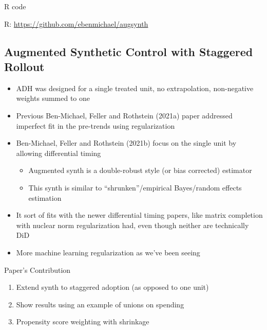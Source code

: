 \documentclass{beamer}
\begin{document}
\begin{frame}{R code}

R: \url{https://github.com/ebenmichael/augsynth}

\end{frame}

\subsection{Augmented Synthetic Control with Staggered Rollout}

\begin{frame}

\begin{itemize}
\item ADH was designed for a single treated unit, no extrapolation, non-negative weights summed to one
\item Previous Ben-Michael, Feller and Rothstein (2021a) paper addressed imperfect fit in the pre-trends using regularization
\item Ben-Michael, Feller and Rothstein (2021b) focus on the single unit by allowing differential timing
	\begin{itemize}
	\item Augmented synth is a double-robust style (or bias corrected) estimator
	\item This synth is similar to ``shrunken''/empirical Bayes/random effects estimation
	\end{itemize}
\item It sort of fits with the newer differential timing papers, like matrix completion with nuclear norm regularization had, even though neither are technically DiD
\item More machine learning regularization as we've been seeing
\end{itemize}

\end{frame}

\begin{frame}{Paper's Contribution}

\begin{enumerate}
	\item Extend synth to staggered adoption (as opposed to one unit)
	\item Show results using an example of unions on spending
	\item Propensity score weighting with shrinkage
\end{enumerate}

\end{frame}
\end{document}
